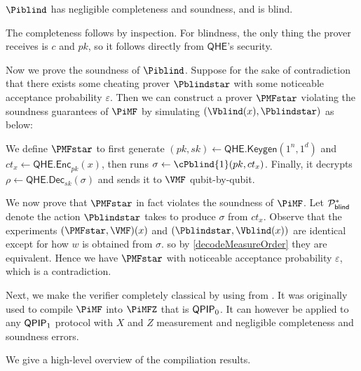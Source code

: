 \begin{thm}
	\label{thm:BlindBQP}
	$\Piblind$ has negligible completeness and soundness, and is blind.
\end{thm}
\begin{prf}
	The completeness follows by inspection.
	For blindness, the only thing the prover receives is $c$ and $pk$, so it follows directly from $\mathsf{QHE}$'s security.
	
	Now we prove the soundness of $\Piblind$.
	Suppose for the sake of contradiction that there exists some cheating prover $\Pblindstar$ with some noticeable acceptance probability $\varepsilon$.
	Then we can construct a prover $\PMFstar$ violating the soundness guarantees of $\PiMF$ by simulating $(\Vblind(x), \Pblindstar)$ as below:

	We define $\PMFstar$ to first generate
	$(pk, sk)\leftarrow\mathsf{QHE.Keygen}(1^n, 1^d)$
	and
	$ct_x\leftarrow\mathsf{QHE.Enc}_{pk}(x)$,
	then runs $\sigma\leftarrow\cPblind{1}(pk, ct_x)$.
	Finally, it decrypts
	$\rho\leftarrow\mathsf{QHE.Dec}_{sk}(\sigma)$
	and sends it to $\VMF$ qubit-by-qubit.

	We now prove that $\PMFstar$ in fact violates the soundness of $\PiMF$.
	Let $\mathcal{P}_{\mathsf{blind}}^*$ denote the action $\Pblindstar$ takes to produce $\sigma$ from $ct_x$.
	Observe that the experiments $(\PMFstar, \VMF)(x)$ and $(\Pblindstar, \Vblind(x))$ are identical except for how $w$ is obtained from $\sigma$.
	so by \cref{decodeMeasureOrder} they are equivalent.
	Hence we have $\PMFstar$ with noticeable acceptance probability $\varepsilon$, which is a contradiction.
\end{prf}


Next, we make the verifier completely classical by using  from \cite{FOCS:Mahadev18a}.
It was originally used to compile $\PiMF$ into $\PiMFZ$ that is $\operatorname{\mathsf{QPIP}}_0$. 
It can however be applied to any $\operatorname{\mathsf{QPIP}}_1$ protocol with $X$ and $Z$ measurement and negligible completeness and soundness errors.

We give a high-level overview of the compiliation results.

